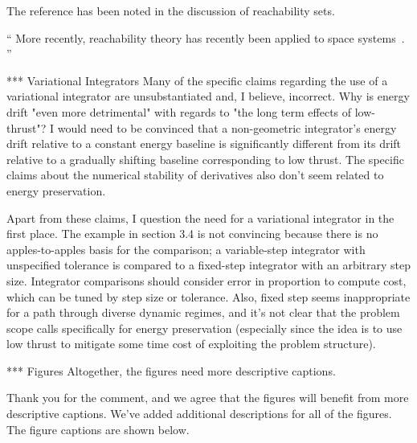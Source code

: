 \documentclass[11pt]{article}
\newenvironment{correction}{\begin{list}{}{\setlength{\leftmargin}{1cm}\setlength{\rightmargin}{1cm}}\vspace{\parsep}\item[]``}{''\end{list}}
\begin{document}
\begin{enumerate}
The reference has been noted in the discussion of reachability sets.
\begin{correction}
More recently, reachability theory has recently been applied to space systems~\cite{holzinger2009,komendera2012a,dellnitz2006}.
\end{correction}

\item
    \begin{itshape}
*** Variational Integrators
Many of the specific claims regarding the use of a variational integrator are unsubstantiated and, I believe, incorrect. Why is energy drift "even more detrimental" with regards to "the long term effects of low-thrust"?  I would need to be convinced that a non-geometric integrator's energy drift relative to a constant energy baseline is significantly different from its drift relative to a gradually shifting baseline corresponding to low thrust. The specific claims about the numerical stability of derivatives also don't seem related to energy preservation.  

\end{itshape}

\item
    \begin{itshape}
Apart from these claims, I question the need for a variational integrator in the first place. The example in section 3.4 is not convincing because there is no apples-to-apples basis for the comparison; a variable-step integrator with unspecified tolerance is compared to a fixed-step integrator with an arbitrary step size.  Integrator comparisons should consider error in proportion to compute cost, which can be tuned by step size or tolerance.  Also, fixed step seems inappropriate for a path through diverse dynamic regimes, and it's not clear that the problem scope calls specifically for energy preservation (especially since the idea is to use low thrust to mitigate some time cost of exploiting the problem structure).  
\end{itshape}

\item
    \begin{itshape}
*** Figures
Altogether, the figures need more descriptive captions.  
\end{itshape}

Thank you for the comment, and we agree that the figures will benefit from more descriptive captions.
We've added additional descriptions for all of the figures.
The figure captions are shown below.


\end{enumerate}
\end{document}
